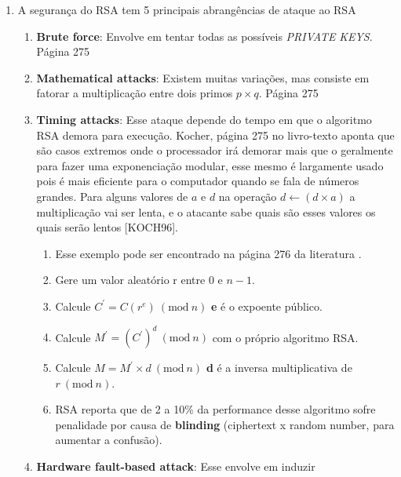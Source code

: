 \documentclass[conference]{IEEEtran}
\begin{document}
\begin{enumerate}
    \begin{enumerate}
      \item A segurança do RSA tem 5 principais abrangências de ataque ao RSA
        \begin{enumerate}
          \item \textbf{Brute force}: Envolve em tentar todas as possíveis
          \textit{PRIVATE} \textit{KEYS}. Página 275 \cite{stallings}
          \item \textbf{Mathematical attacks}: Existem muitas variações, mas
          consiste em fatorar a multiplicação entre dois primos $p \times q$.
          Página 275 \cite{stallings}
          \item \textbf{Timing attacks}: Esse ataque depende do tempo em que o
          algoritmo RSA demora para execução. Kocher, página 275 no livro-texto
          \cite{stallings} aponta que são casos extremos onde o processador irá
          demorar mais que o geralmente para fazer uma exponenciação modular,
          esse mesmo é largamente usado pois é mais eficiente para o computador
          quando se fala de números grandes. Para alguns valores de $a$ e $d$ na
          operação $d \gets (d \times a)$ a multiplicação vai ser lenta, e o
          atacante sabe quais são esses valores os quais serão lentos [KOCH96].
            \begin{enumerate}
              \item Esse exemplo pode ser encontrado na página 276 da literatura
              \cite{stallings}.
              \item Gere um valor aleatório r entre 0 e $n - 1$.
              \item Calcule $C^{'} = C(r^e) \ (\textrm{mod}\ n)$ \textbf{e} é o 
              expoente público.
              \item Calcule $M^{'} = {(C^{'})}^d \ (\textrm{mod}\ n)$ com o 
              próprio algoritmo RSA.
              \item Calcule $M = M^{'} \times d \ (\textrm{mod}\ n)$ \textbf{d}
              é a inversa multiplicativa de $r \ (\textrm{mod}\ n)$.
              \item RSA reporta que de 2 a 10\% da performance desse algoritmo
              sofre penalidade por causa de \textbf{blinding} (ciphertext x 
              random number, para aumentar a confusão).
            \end{enumerate}
          \item \textbf{Hardware fault-based attack}: Esse envolve em induzir

\end{enumerate}
\end{enumerate}
\end{enumerate}
\end{document}
